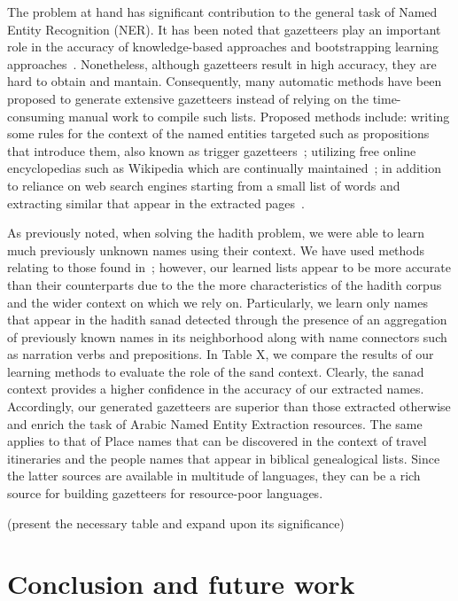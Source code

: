\documentclass[11pt]{article}
\begin{document}
The problem at hand has significant contribution to the general task of Named Entity Recognition (NER). It has been noted that
gazetteers play an important role in the accuracy of knowledge-based approaches and bootstrapping learning
approaches~\cite{Kozareva:06,Carlson:09,Toral:06,Benajiba:07,Kazama:08,Nadeau:06}. Nonetheless, although gazetteers result in high accuracy,
they are hard to obtain and mantain. %
Consequently, many automatic methods have been proposed to generate extensive gazetteers instead of relying on the time-consuming manual work
to compile such lists. Proposed methods include: writing some rules for the context of the named entities targeted such as propositions that
introduce them, also known as trigger gazetteers~\cite{Kozareva:06,Toral:06}; utilizing free online encyclopedias such as Wikipedia which are 
continually maintained~\cite{Benajiba:07,Kazama:08}; in addition to reliance on web search engines starting from a small list of words and extracting
similar that appear in the extracted pages~\cite{Nadeau:06}.

As previously noted, when solving the hadith problem, we were able to learn much previously unknown names using their context. We have used methods
relating to those found in~\cite{Traboulsi:09,Kozareva:06}; however, our learned lists appear to be more accurate than their counterparts due to the
the more characteristics of the hadith corpus and the wider context on which we rely on. Particularly, we learn only names that appear in the hadith sanad
detected through the presence of an aggregation of previously known names in its neighborhood along with name connectors such as narration verbs and 
prepositions. In Table X, we compare the results of our learning methods to evaluate the role of the sand context. Clearly, the sanad context provides 
a higher confidence in the accuracy of our extracted names. Accordingly, our generated gazetteers are superior than those extracted otherwise and 
enrich the task of Arabic Named Entity Extraction resources. The same applies to that of Place names that can be discovered in the context of travel
itineraries and the people names that appear in biblical genealogical lists. Since the latter sources are available in multitude of languages, they
can be a rich source for building gazetteers for resource-poor languages.

(present the necessary table and expand upon its significance)

\section{Conclusion and future work}
\label{sec:future}
\end{document}
